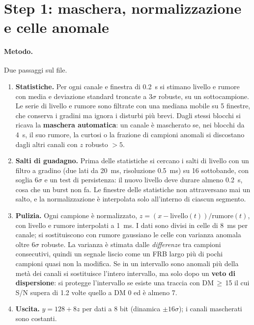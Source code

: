 \FloatBarrier
\section{Step 1: maschera, normalizzazione e celle anomale}
\label{sec:step1}

\paragraph{Metodo.} Due passaggi sul file.
\begin{enumerate}
  \item \textbf{Statistiche.} Per ogni canale e finestra di \SI{0.2}{\second} si stimano livello e rumore con media e
    deviazione standard troncate a $3\sigma$ robuste, su un sottocampione. Le serie di livello e rumore sono filtrate con
    una mediana mobile su 5 finestre, che conserva i gradini ma ignora i disturbi più brevi. Dagli stessi blocchi si
    ricava la \textbf{maschera automatica}: un canale è mascherato se, nei blocchi da \SI{4}{\second}, il suo rumore, la
    curtosi o la frazione di campioni anomali si discostano dagli altri canali con $z$ robusto $>5$.
  \item \textbf{Salti di guadagno.} Prima delle statistiche si cercano i salti di livello con un filtro a gradino
    (due lati da \SI{20}{\milli\second}, risoluzione \SI{0.5}{\milli\second}) su 16 sottobande, con soglia $6\sigma$ e un
    test di persistenza: il nuovo livello deve durare almeno \SI{0.2}{\second}, cosa che un burst non fa. Le finestre
    delle statistiche non attraversano mai un salto, e la normalizzazione è interpolata solo all'interno di ciascun
    segmento.
  \item \textbf{Pulizia.} Ogni campione è normalizzato, $z=(x-\text{livello}(t))/\text{rumore}(t)$, con livello e
    rumore interpolati a \SI{1}{\milli\second}. I dati sono divisi in celle di \SI{8}{\milli\second} per canale; si
    sostituiscono con rumore gaussiano le celle con varianza anomala oltre $6\sigma$ robuste. La varianza è stimata
    dalle \emph{differenze} tra campioni consecutivi, quindi un segnale liscio come un FRB largo più di pochi campioni
    quasi non la modifica. Se in un intervallo sono anomali più della metà dei canali si sostituisce l'intero
    intervallo, ma solo dopo un \textbf{veto di dispersione}: si protegge l'intervallo se esiste una traccia con
    DM\,$\geq$\,15 il cui S/N supera di 1.2 volte quello a DM 0 ed è almeno 7.
  \item \textbf{Uscita.} $y=128+8z$ per dati a 8 bit (dinamica $\pm16\sigma$); i canali mascherati sono costanti.
\end{enumerate}

